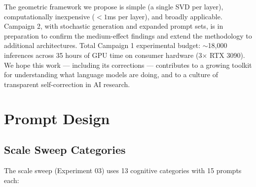 \documentclass[11pt,a4paper]{article}
\begin{document}
The geometric framework we propose is simple (a single SVD per layer), computationally inexpensive ($< 1$ms per layer), and broadly applicable. Campaign 2, with stochastic generation and expanded prompt sets, is in preparation to confirm the medium-effect findings and extend the methodology to additional architectures. Total Campaign 1 experimental budget: $\sim$18,000 inferences across 35 hours of GPU time on consumer hardware (3$\times$ RTX 3090). We hope this work --- including its corrections --- contributes to a growing toolkit for understanding what language models are doing, and to a culture of transparent self-correction in AI research.




\appendix

\section{Prompt Design}
\label{app:prompts}

\subsection{Scale Sweep Categories}

The scale sweep (Experiment 03) uses 13 cognitive categories with 15 prompts each:
\end{document}
